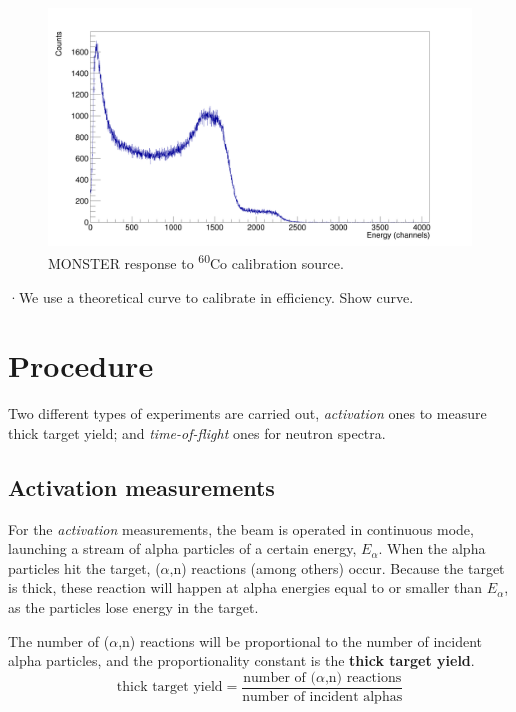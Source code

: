 \documentclass[a4paper,12pt]{report}
\newcommand{\an}{($\alpha$,n) }
\begin{document}
\begin{figure}[H]
	\centering
	\includegraphics[width=\textwidth]{monster_co_calibration.png}
	\caption{MONSTER response to \textsuperscript{60}Co calibration source.}
	\label{monster_co_calibration}
\end{figure}

·We use a theoretical curve to calibrate in efficiency. Show curve.\\

\section{Procedure}
Two different types of experiments are carried out, \textit{activation} ones to measure thick target yield; and \textit{time-of-flight} ones for neutron spectra.

\subsection{Activation measurements}
For the \textit{activation} measurements, the beam is operated in continuous mode, launching a stream of alpha particles of a certain energy, $E_\alpha$.
When the alpha particles hit the target, \an reactions (among others) occur.
Because the target is thick, these reaction will happen at alpha energies equal to or smaller than $E_\alpha$, as the particles lose energy in the target.

The number of \an reactions will be proportional to the number of incident alpha particles, and the proportionality constant is the \textbf{thick target yield}.
\begin{equation}
	\text{thick target yield} = \frac{\text{number of \an reactions}}{\text{number of incident alphas}}
\end{equation}
\end{document}
